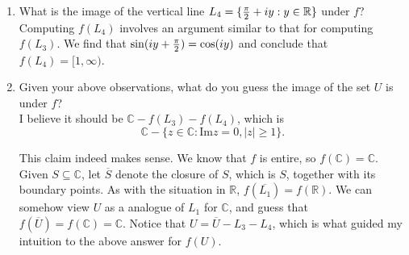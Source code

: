 \documentclass[12pt]{article}
\newcommand{\C}{\mathbb{C}}
\newcommand{\R}{\mathbb{R}}
\renewcommand{\Im}{\text{Im}}
\newcommand{\ol}{\overline}
\begin{document}
\begin{enumerate}
\item What is the image of the vertical line $L_4=\{{\pi\over2}+iy:y\in\R\}$ under $f$?\\

Computing $f(L_4)$ involves an argument similar to that for computing $f(L_3)$. We find that $\sin(iy+{\pi\over2})=\cos(iy)$ and conclude that $f(L_4)=[1,\infty)$.

\item Given your above observations, what do you guess the image of the set $U$ is under $f$?\\

I believe it should be $\C-f(L_3)-f(L_4)$, which is $$\C-\{z\in\C: \Im z = 0, |z|\ge1\}.$$

This claim indeed makes sense.
We know that $f$ is entire, so $f(\C)=\C$. Given $S\subseteq\C$, let $\ol{S}$ denote the closure of $S$, which is $S$, together with its boundary points. As with the situation in $\R$, $f(\ol{L_1})=f(\R)$. We can somehow view $U$ as a analogue of $L_1$ for $\C$, and  guess that $f(\ol{U})=f(\C)=\C$. Notice that $U=\ol{U}-L_3-L_4$, which is what guided my intuition to the above answer for $f(U)$.

\end{enumerate}
\end{document}
